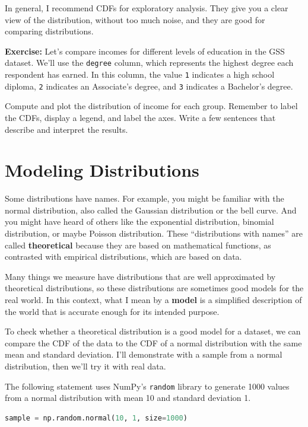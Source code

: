 In general, I recommend CDFs for exploratory analysis. They give you a
clear view of the distribution, without too much noise, and they are
good for comparing distributions.

\textbf{Exercise:} Let's compare incomes for different levels of
education in the GSS dataset. We'll use the
\passthrough{\lstinline!degree!} column, which represents the highest
degree each respondent has earned. In this column, the value
\passthrough{\lstinline!1!} indicates a high school diploma,
\passthrough{\lstinline!2!} indicates an Associate's degree, and
\passthrough{\lstinline!3!} indicates a Bachelor's degree.

Compute and plot the distribution of income for each group. Remember to
label the CDFs, display a legend, and label the axes. Write a few
sentences that describe and interpret the results.

\section{Modeling Distributions}\label{modeling-distributions}

Some distributions have names. For example, you might be familiar with
the normal distribution, also called the Gaussian distribution or the
bell curve. And you might have heard of others like the exponential
distribution, binomial distribution, or maybe Poisson distribution.
These ``distributions with names'' are called \textbf{theoretical}
because they are based on mathematical functions, as contrasted with
empirical distributions, which are based on data.

Many things we measure have distributions that are well approximated by
theoretical distributions, so these distributions are sometimes good
models for the real world. In this context, what I mean by a
\textbf{model} is a simplified description of the world that is accurate
enough for its intended purpose.

To check whether a theoretical distribution is a good model for a
dataset, we can compare the CDF of the data to the CDF of a normal
distribution with the same mean and standard deviation. I'll demonstrate
with a sample from a normal distribution, then we'll try it with real
data.

The following statement uses NumPy's \passthrough{\lstinline!random!}
library to generate 1000 values from a normal distribution with mean 10
and standard deviation 1.

\begin{lstlisting}[language=Python,style=source]
sample = np.random.normal(10, 1, size=1000)
\end{lstlisting}

